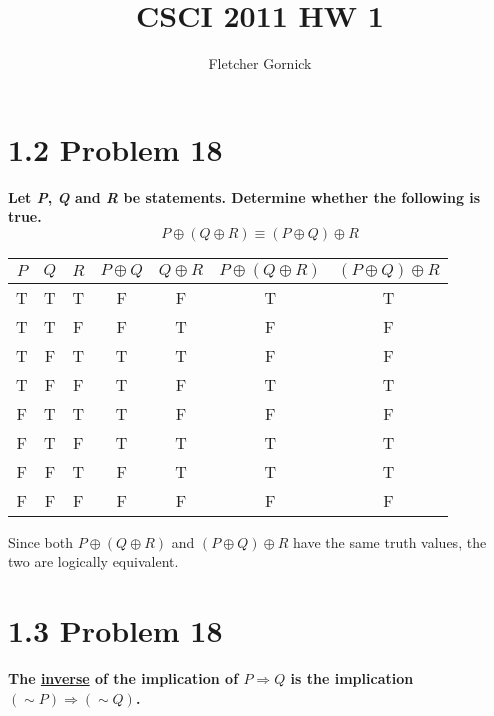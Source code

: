 \documentclass[10pt]{article}
\title{CSCI 2011 HW 1}
\author{Fletcher Gornick}
\begin{document}
\maketitle

\section{1.2 Problem 18}
\textbf{Let \textit{P}, \textit{Q} and \textit{R} be statements. Determine whether
the following is true.} $$P \oplus (Q \oplus R) \equiv (P \oplus Q) \oplus R$$

\begin{table}[ht]
    \centering
    \begin{tabular}{|c|c|c|c|c|c|c|}

        \hline
        $P$ & $Q$ & $R$ & $P \oplus Q$ & $Q \oplus R$ & $P \oplus (Q \oplus R)$ & 
        $(P \oplus Q) \oplus R$ \\
        \hline
        \hline
        T & T & T & F & F & \cellcolor[gray]{0.8} T & \cellcolor[gray]{0.8} T \\
        \hline
        T & T & F & F & T & \cellcolor[gray]{0.8} F & \cellcolor[gray]{0.8} F \\
        \hline
        T & F & T & T & T & \cellcolor[gray]{0.8} F & \cellcolor[gray]{0.8} F \\
        \hline
        T & F & F & T & F & \cellcolor[gray]{0.8} T & \cellcolor[gray]{0.8} T \\
        \hline
        F & T & T & T & F & \cellcolor[gray]{0.8} F & \cellcolor[gray]{0.8} F \\
        \hline
        F & T & F & T & T & \cellcolor[gray]{0.8} T & \cellcolor[gray]{0.8} T \\
        \hline
        F & F & T & F & T & \cellcolor[gray]{0.8} T & \cellcolor[gray]{0.8} T \\
        \hline
        F & F & F & F & F & \cellcolor[gray]{0.8} F & \cellcolor[gray]{0.8} F \\
        \hline

    \end{tabular}
\end{table}

Since both $P \oplus (Q \oplus R)$ and $(P \oplus Q) \oplus R$ have the same truth
values, the two are logically equivalent.



\section{1.3 Problem 18}
\textbf{The \underline{inverse} of the implication of $P \Rightarrow Q$ is the
implication $(\sim P) \Rightarrow (\sim Q)$.}
\end{document}
